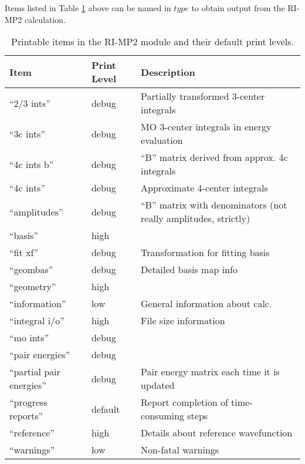 Items listed in Table \ref{tbl:mp2-printable} above can be named in 
$type$ to obtain output from the RI-MP2 calculation.

\begin{table}
\caption{Printable items in the RI-MP2 module and their default print levels.}
\label{tbl:mp2-printable}
\begin{tabular}{lll}
\hline\hline
Item                    & Print Level   & Description \\
\hline
``2/3 ints''              & debug         & Partially transformed 3-center integrals \\
``3c ints''               & debug         & MO 3-center integrals in energy evaluation \\
``4c ints b''             & debug         & ``B'' matrix derived from approx. 4c integrals \\
``4c ints''               & debug         & Approximate 4-center integrals \\
``amplitudes''            & debug         & ``B'' matrix with denominators (not really amplitudes, strictly) \\
``basis''                 & high          & \\
``fit xf''                & debug         & Transformation for fitting basis \\
``geombas''               & debug         & Detailed basis map info\\
``geometry''              & high          & \\
``information''           & low           & General information about calc.\\
``integral i/o''          & high          & File size information\\
``mo ints''               & debug         & \\
``pair energies''         & debug         & \\
``partial pair energies'' & debug         & Pair energy matrix each time it is updated \\
``progress reports''      & default       & Report completion of time-consuming steps\\
``reference''             & high          & Details about reference wavefunction\\
``warnings''              & low           & Non-fatal warnings \\
\hline\hline
\end{tabular}
\end{table}

